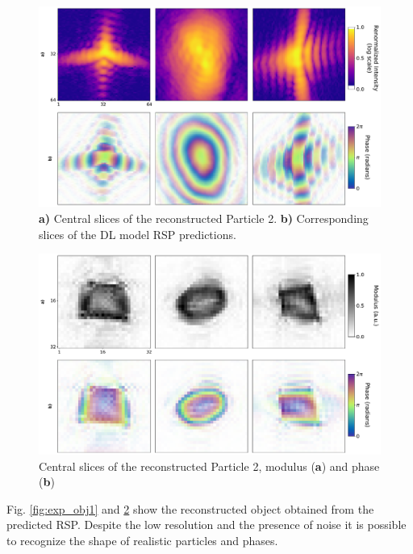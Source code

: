 \begin{figure}[H]
    \centering
    \includegraphics[width=\textwidth]{figures/Phasing/exp_data2.pdf}
    \caption{\textbf{a)} Central slices of the reconstructed Particle 2. \textbf{b)} Corresponding 
    slices of the DL model RSP predictions.}
    \label{fig:exp_RSP2}
\end{figure}

\begin{figure}[H]
    \centering
    \includegraphics[width=\textwidth]{figures/Phasing/exp_data_rec2.pdf}
    \caption{Central slices of the reconstructed Particle 2, modulus (\textbf{a}) and phase  (\textbf{b})}
    \label{fig:exp_obj2}
\end{figure}

Fig. \ref{fig:exp_obj1} and \ref{fig:exp_obj2} show the reconstructed object obtained from the predicted RSP. Despite the 
low resolution and the presence of noise it is possible to recognize the shape of realistic particles and phases.

